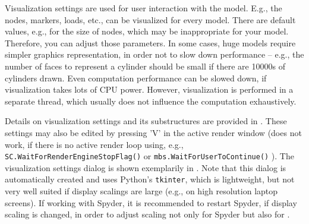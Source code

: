 %
Visualization settings are used for user interaction with the model. E.g., the nodes, markers, loads, etc., can be visualized for every model. There are default values, e.g., for the size of nodes, which may be inappropriate for your model. Therefore, you can adjust those parameters. In some cases, huge models require simpler graphics representation, in order not to slow down performance -- e.g., the number of faces to represent a cylinder should be small if there are 10000s of cylinders drawn. Even computation performance can be slowed down, if visualization takes lots of CPU power. However, visualization is performed in a separate thread, which usually does not influence the computation exhaustively.

Details on visualization settings and its substructures are provided in . These settings may also be edited by pressing 'V' in the active render window (does not work, if there is no active render loop using, e.g., \texttt{SC.WaitForRenderEngineStopFlag()} or 
\texttt{mbs.WaitForUserToContinue()} ).
The visualization settings dialog is shown exemplarily in .
Note that this dialog is automatically created and uses Python's \texttt{tkinter}, which is lightweight, but not very well suited if display scalings are large (e.g., on high resolution laptop screens). If working with Spyder, it is recommended to restart Spyder, if display scaling is changed, in order to adjust scaling not only for Spyder but also for \codeName.

